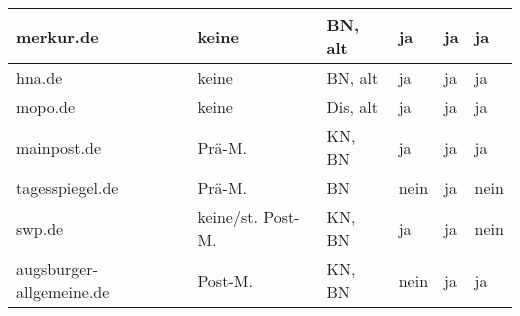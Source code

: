 \begin{longtable}{p{28mm}*{5}{l}}
merkur.de
& keine
& BN, alt
& ja
& ja
& ja
\\*\midrule

hna.de
& keine
& BN, alt
& ja
& ja
& ja
\\*\midrule

mopo.de
& keine
& Dis, alt
& ja
& ja
& ja
\\*\midrule

mainpost.de
& Prä-M.
& KN, BN
& ja
& ja
& ja
\\*\midrule

tagesspiegel.de
& Prä-M.
& BN
& nein
& ja
& nein
\\*\midrule

swp.de
& keine/st. Post-M.
& KN, BN
& ja
& ja
& nein
\\*\midrule

augsburger-allgemeine.de
& Post-M.
& KN, BN
& nein
& ja
& ja
\\*\midrule



  \end{longtable}
\endgroup



